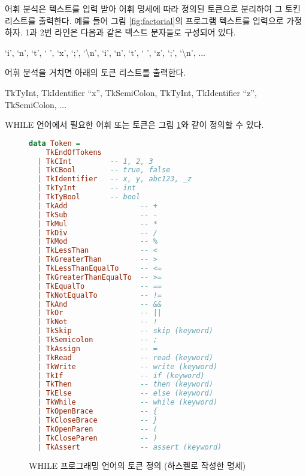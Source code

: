 \documentclass[a4paper]{book}
\begin{document}
어휘 분석은 텍스트를 입력 받아 어휘 명세에 따라 정의된 토큰으로
분리하여 그 토킨 리스트를 출력한다. 예를 들어 그림
\ref{fig:factorial}의 프로그램 텍스트를 입력으로 가정하자.  1과 2번
라인은 다음과 같은 텍스트 문자들로 구성되어 있다.

\begin{center}
  `i', `n', `t', ` ', `x', `;', `\textbackslash n', `i', `n', `t', ` ', `z', `;', `\textbackslash n', ...
\end{center}

어휘 분석을 거치면 아래의 토큰 리스트를 출력한다.

{\small
\begin{center}
  TkTyInt, TkIdentifier ``x'', TkSemiColon, TkTyInt, TkIdentifier ``z'', TkSemiColon, ...
\end{center}
}

WHILE 언어에서 필요한 어휘 또는 토큰은 그림
\ref{fig:haskelltokendatatype}와 같이 정의할 수 있다.

\begin{figure}[h]
{\footnotesize
\begin{center}
\begin{minipage}[h]{.7\textwidth}
\begin{lstlisting}[language=Haskell]
data Token =
    TkEndOfTokens
  | TkCInt         -- 1, 2, 3
  | TkCBool        -- true, false
  | TkIdentifier   -- x, y, abc123, _z
  | TkTyInt        -- int
  | TkTyBool       -- bool
  | TkAdd                 -- +
  | TkSub                 -- -
  | TkMul                 -- *
  | TkDiv                 -- /
  | TkMod                 -- %
  | TkLessThan            -- <
  | TkGreaterThan         -- >
  | TkLessThanEqualTo     -- <=
  | TkGreaterThanEqualTo  -- >=
  | TkEqualTo             -- ==
  | TkNotEqualTo          -- !=
  | TkAnd                 -- &&
  | TkOr                  -- ||
  | TkNot                 -- !
  | TkSkip                -- skip (keyword)
  | TkSemicolon           -- ;
  | TkAssign              -- =
  | TkRead                -- read (keyword)
  | TkWrite               -- write (keyword)
  | TkIf                  -- if (keyword)
  | TkThen                -- then (keyword)
  | TkElse                -- else (keyword)
  | TkWhile               -- while (keyword)
  | TkOpenBrace           -- {
  | TkCloseBrace          -- }
  | TkOpenParen           -- (
  | TkCloseParen          -- )
  | TkAssert              -- assert (keyword)
\end{lstlisting}
\end{minipage}
\end{center}
}
\caption{WHILE 프로그래밍 언어의 토큰 정의 (하스켈로 작성한 명세)}
\label{fig:haskelltokendatatype}
\end{figure}
\end{document}

